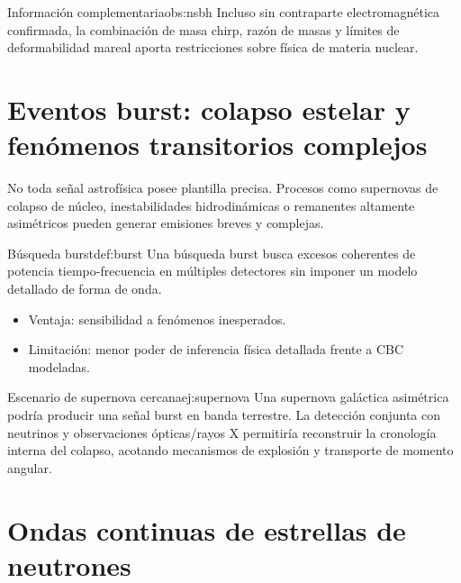 \begin{observacion}{Información complementaria}{obs:nsbh}
Incluso sin contraparte electromagnética confirmada, la combinación de masa chirp, razón de masas y límites de deformabilidad mareal aporta restricciones sobre física de materia nuclear.
\end{observacion}

\section{Eventos burst: colapso estelar y fenómenos transitorios complejos}
\label{sec:bursts}

No toda señal astrofísica posee plantilla precisa. Procesos como supernovas de colapso de núcleo, inestabilidades hidrodinámicas o remanentes altamente asimétricos pueden generar emisiones breves y complejas.

\begin{definicion}{Búsqueda burst}{def:burst}
Una búsqueda burst busca excesos coherentes de potencia tiempo-frecuencia en múltiples detectores sin imponer un modelo detallado de forma de onda.
\end{definicion}

\begin{itemize}[leftmargin=2em]
  \item Ventaja: sensibilidad a fenómenos inesperados.
  \item Limitación: menor poder de inferencia física detallada frente a CBC modeladas.
\end{itemize}

\begin{ejemplo}{Escenario de supernova cercana}{ej:supernova}
Una supernova galáctica asimétrica podría producir una señal burst en banda terrestre. La detección conjunta con neutrinos y observaciones ópticas/rayos X permitiría reconstruir la cronología interna del colapso, acotando mecanismos de explosión y transporte de momento angular.
\end{ejemplo}

\section{Ondas continuas de estrellas de neutrones}
\label{sec:ondas_continuas}

